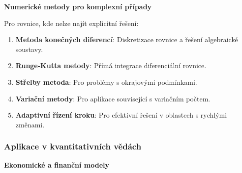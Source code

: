 \vspace{1\baselineskip}

\noindent\textbf{Numerické metody pro komplexní případy}

Pro rovnice, kde nelze najít explicitní řešení:

\begin{enumerate}
\item \textbf{Metoda konečných diferencí}: Diskretizace rovnice a řešení algebraické soustavy.

\item \textbf{Runge-Kutta metody}: Přímá integrace diferenciální rovnice.

\item \textbf{Střelby metoda}: Pro problémy s okrajovými podmínkami.

\item \textbf{Variační metody}: Pro aplikace související s variačním počtem.

\item \textbf{Adaptivní řízení kroku}: Pro efektivní řešení v oblastech s rychlými změnami.
\end{enumerate}

\subsubsection{Aplikace v kvantitativních vědách}
\label{subsubsec:aplikace-lagrange}

\noindent\textbf{Ekonomické a finanční modely}

